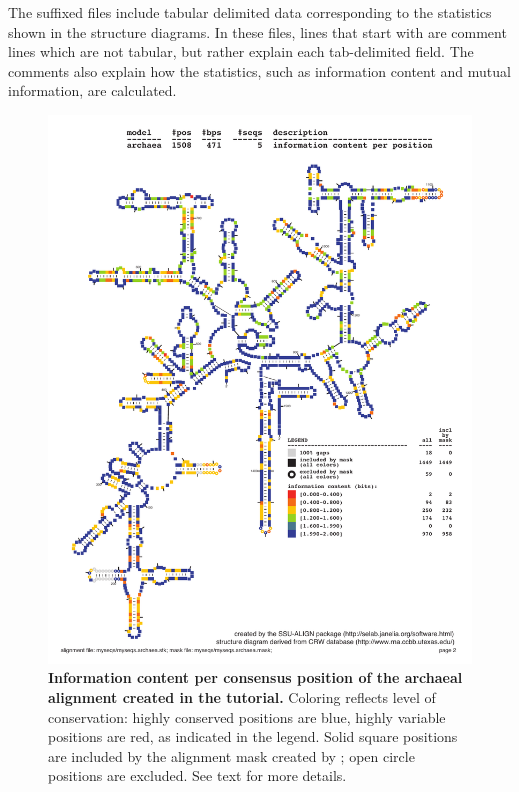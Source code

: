 The  suffixed files include tabular delimited data
corresponding to the statistics shown in the structure diagrams. In
these files, lines that start with \prog{\#} are comment lines
which are not tabular, but rather explain each tab-delimited field. The
comments also explain how the statistics, such as information content
and mutual information, are calculated.

\begin{figure}
  \begin{center}
\includegraphics[width=5.7in]{Figures/myseqs-archaea-info}
  \end{center}
\caption{\textbf{Information content per consensus position of the
          archaeal alignment created in the tutorial.} Coloring
  reflects level of conservation: highly conserved positions are blue,
  highly variable positions are red, as indicated in the
  legend. Solid square positions are included by the alignment mask
  created by ; open circle positions are excluded. See
  text for more details.}
\label{fig:myseqs-archaea-info}
\end{figure}

